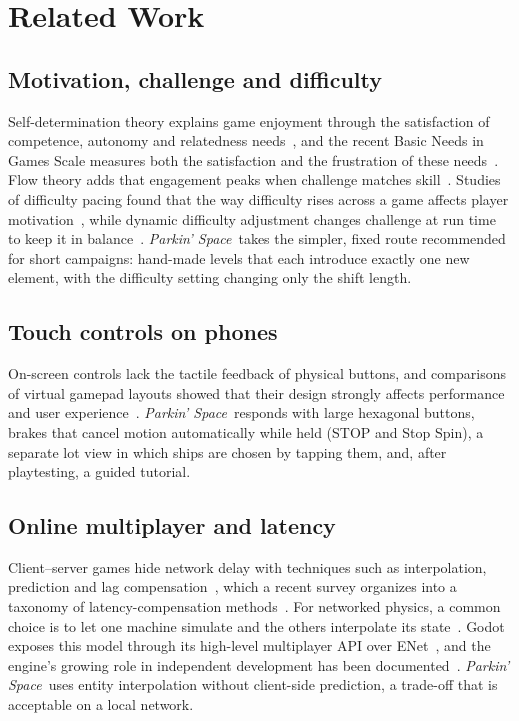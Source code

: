 \documentclass[conference]{IEEEtran}
\newcommand{\game}{\textit{Parkin' Space}}
\begin{document}
\section{Related Work}
\subsection{Motivation, challenge and difficulty}
Self-determination theory explains game enjoyment through the satisfaction of competence, autonomy and relatedness needs~\cite{ryan2006}, and the recent Basic Needs in Games Scale measures both the satisfaction and the frustration of these needs~\cite{ballou2024}. Flow theory adds that engagement peaks when challenge matches skill~\cite{csikszentmihalyi1990}. Studies of difficulty pacing found that the way difficulty rises across a game affects player motivation~\cite{raofernandes2022}, while dynamic difficulty adjustment changes challenge at run time to keep it in balance~\cite{robb2022}. \game\ takes the simpler, fixed route recommended for short campaigns: hand-made levels that each introduce exactly one new element, with the difficulty setting changing only the shift length.

\subsection{Touch controls on phones}
On-screen controls lack the tactile feedback of physical buttons, and comparisons of virtual gamepad layouts showed that their design strongly affects performance and user experience~\cite{baldauf2015}. \game\ responds with large hexagonal buttons, brakes that cancel motion automatically while held (STOP and Stop Spin), a separate lot view in which ships are chosen by tapping them, and, after playtesting, a guided tutorial.

\subsection{Online multiplayer and latency}
Client--server games hide network delay with techniques such as interpolation, prediction and lag compensation~\cite{bernier2001}, which a recent survey organizes into a taxonomy of latency-compensation methods~\cite{liu2022}. For networked physics, a common choice is to let one machine simulate and the others interpolate its state~\cite{fiedler2015}. Godot exposes this model through its high-level multiplayer API over ENet~\cite{godotdocs}, and the engine's growing role in independent development has been documented~\cite{holfeld2023}. \game\ uses entity interpolation without client-side prediction, a trade-off that is acceptable on a local network.
\end{document}
